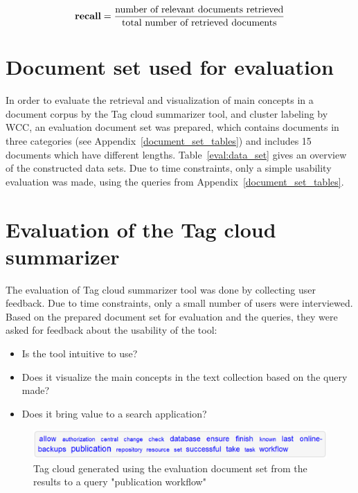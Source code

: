 \begin{equation}
\mbox{\textbf{recall}} = \frac{\mbox{number of relevant documents retrieved}} {\mbox{total number of retrieved documents}}
\end{equation}

\section{Document set used for evaluation}
In order to evaluate the retrieval and visualization of main concepts in a document corpus by the Tag cloud summarizer tool, and cluster labeling by \gls{WCC}, an evaluation document set was prepared, which contains documents in three categories (see Appendix~\ref{document_set_tables}) and includes 15 documents which have different lengths. Table~\ref{eval:data_set} gives an overview of the constructed data sets. Due to time constraints, only a simple usability evaluation was made, using the queries from Appendix~\ref{document_set_tables}.


\section{Evaluation of the Tag cloud summarizer}
The evaluation of Tag cloud summarizer tool was done by collecting user feedback. Due to time constraints, only a small number of users were interviewed. Based on the prepared document set for evaluation and the queries, they were asked for feedback about the usability of the tool: \\
\begin{itemize}
\item Is the tool intuitive to use?
\item Does it visualize the main concepts in the text collection based on the query made?
\item Does it bring value to a search application?

\end{itemize}

\begin{figure}[H]
	\centering
	\includegraphics[scale=0.5]{img/publication_workflow} 
	\caption[Tag cloud generated]{Tag cloud generated using the evaluation document set from the results to a query "publication workflow"}
\label{publication_workflow}
\end{figure}


